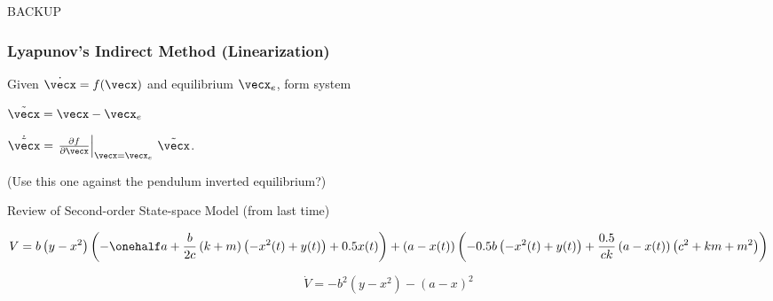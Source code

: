 \documentclass[12pt]{beamer}
\begin{document}
\begin{frame}
BACKUP
\end{frame}






\begin{frame}
\frametitle{Lyapunov's Indirect Method (Linearization)}

Given $\dot \vecx = f(\vecx)$ and equilibrium $\vecx_e$,
form system

$\tilde\vecx = \vecx - \vecx_e$

$\dot{\tilde\vecx}
	= \left.
		\frac{\partial f }{\partial\vecx} \right|_{\vecx=\vecx_e}
		\, \tilde\vecx$.

(Use this one against the pendulum inverted equilibrium?)

\end{frame}




\begin{frame}{Review of Second-order State-space Model (from last time)}

\begin{equation}
V = b \left( y - x^{2}\right)
	\left(
		-\onehalf a + \frac{b}{2c} \left(k + m\right) \left(- x^{2}{\left (t \right )} + y{\left (t \right )}\right) + 0.5 x{\left (t \right )}\right)
		+ \left(a - x{\left (t \right )}\right) \left(- 0.5 b \left(- x^{2}{\left (t \right )} + y{\left (t \right )}\right) + \frac{0.5}{c k} \left(a - x{\left (t \right )}\right) \left(c^{2} + k m + m^{2}\right)\right)
\end{equation}

\begin{equation}
\dot V = -b^2 \left( y - x^2 \right) - \left( a - x \right)^2
\end{equation}

\end{frame}













\begin{frame}\end{frame}
\begin{frame}\end{frame}
\begin{frame}\end{frame}
\begin{frame}\end{frame}
\end{document}
